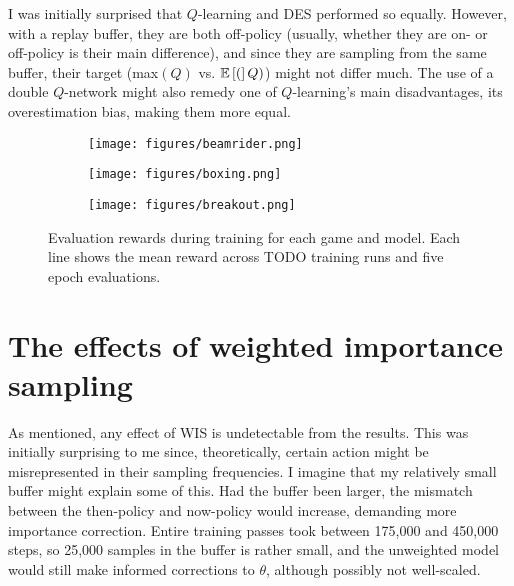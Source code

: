 \documentclass{article}
\begin{document}
I was initially surprised that \(Q\)-learning and DES performed so equally. However, with a replay buffer, they are both off-policy (usually, whether they are on- or off-policy is their main difference), and since they are sampling from the same buffer, their target (max\((Q)\) vs. \(\mathbb{E}\left[ ( \right]Q)\)) might not differ much. The use of a double \(Q\)-network might also remedy one of \(Q\)-learning's main disadvantages, its overestimation bias, making them more equal.

\begin{figure}[h]
    \centering
    \begin{subfigure}[b]{0.7\textwidth}
        \texttt{[image: figures/beamrider.png]}
    \end{subfigure}
    
    \vspace{1em}  %
    
    \begin{subfigure}[b]{0.7\textwidth}
        \texttt{[image: figures/boxing.png]}
    \end{subfigure}
    
    \vspace{1em}  %
    
    \begin{subfigure}[b]{0.7\textwidth}
        \texttt{[image: figures/breakout.png]}
    \end{subfigure} 
    \caption{Evaluation rewards during training for each game and model. Each line shows the mean reward across TODO training runs and five epoch evaluations.}
    \label{fig:results}
\end{figure}

\section{The effects of weighted importance sampling}
As mentioned, any effect of WIS is undetectable from the results. This was initially surprising to me since, theoretically, certain action might be misrepresented in their sampling frequencies. I imagine that my relatively small buffer might explain some of this. Had the buffer been larger, the mismatch between the then-policy and now-policy would increase, demanding more importance correction. Entire training passes took between 175,000 and 450,000 steps, so 25,000 samples in the buffer is rather small, and the unweighted model would still make informed corrections to \(\theta\), although possibly not well-scaled.
\end{document}
